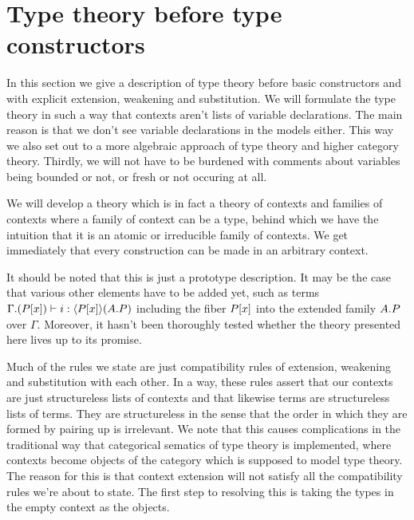 \section{Type theory before type constructors}\label{tt}
In this section we give a description of type theory before basic
constructors and with explicit extension, weakening and substitution. We will
formulate the type theory in such a way that contexts aren't lists of variable
declarations. The main reason is that we don't see variable declarations in the
models either. This way we also set out to a more algebraic approach of type
theory and higher category theory. Thirdly, we will not have to be burdened with
comments about variables being bounded or not, or fresh or not occuring at all.

We will develop a theory which is in fact a theory of contexts and families of
contexts where a family of context can be a type, behind which we have the
intuition that it is an atomic or irreducible family of contexts. We get immediately
that every construction can be made in an arbitrary context. 

It should be noted that this is just a prototype description. It may be the case
that various other elements have to be added yet, such as terms
$\jterm{\ctxext{\Gamma}{\subst{x}{P}}}{\ctxwk{\subst{x}{P}}{\ctxext{A}{P}}}{i}$
including the fiber $\subst{x}{P}$ into the extended family $\ctxext{A}{P}$ over
$\Gamma$. Moreover, it hasn't been thoroughly tested whether the theory presented
here lives up to its promise.

Much of the rules we state are just compatibility rules of extension, weakening
and substitution with each other. In a way, these rules assert that our contexts
are just structureless lists of contexts and that likewise terms are structureless
lists of terms. They are structureless in the sense that the order in which
they are formed by pairing up is irrelevant. We note that this causes complications
in the traditional way that categorical sematics of type theory is implemented,
where contexts become objects of the category which is supposed to model type
theory. The reason for this is that context extension will not satisfy all the
compatibility rules we're about to state. The first step to resolving this is taking
the types in the empty context as the objects. 

